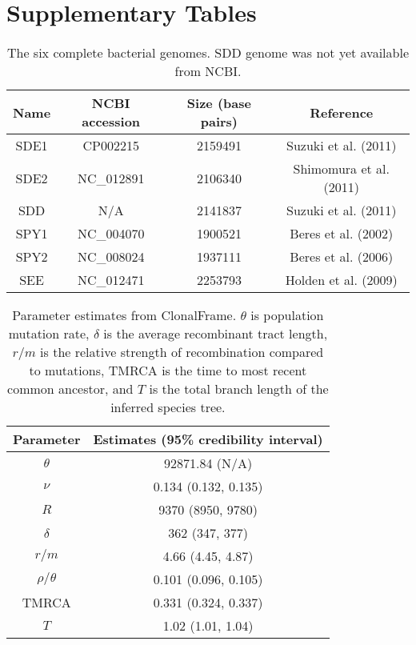 \documentclass[english]{article}
\providecommand{\tabularnewline}{\\}
\begin{document}
\clearpage{}\setcounter{figure}{0}
\setcounter{table}{0}
\renewcommand{\figurename}{Supplementary Figure}
\renewcommand{\tablename}{Supplementary Table}

\section*{Supplementary Tables}
\clearpage{}

\begin{table}
\caption{\label{tab:genome}The six complete bacterial genomes. SDD genome was
not yet available from NCBI.}
\noindent \begin{centering}
\begin{tabular}{cccc}
\hline 
Name & NCBI accession & Size (base pairs) & Reference\tabularnewline
\hline
SDE1 & CP002215 & 2159491 & Suzuki et al. (2011)\tabularnewline
SDE2 & NC\_012891 & 2106340 & Shimomura et al. (2011)\tabularnewline
SDD & N/A & 2141837 & Suzuki et al. (2011)\tabularnewline
SPY1 & NC\_004070 & 1900521 & Beres et al. (2002)\tabularnewline
SPY2 & NC\_008024 & 1937111 & Beres et al. (2006)\tabularnewline
SEE & NC\_012471 & 2253793 & Holden et al. (2009)\tabularnewline
\hline
\end{tabular}
\par\end{centering}
\end{table}
\clearpage{}

\begin{table}
\caption{\label{tab:clonalframe}Parameter estimates from ClonalFrame. 
$\theta$ is population mutation rate,
$\delta$ is the average recombinant tract length,
$r/m$ is the relative strength of recombination compared to mutations,
TMRCA is the time to most recent common ancestor, and
$T$ is the total branch length of the inferred species tree.}
\noindent \centering{}\begin{tabular}{cc}
\hline
Parameter & Estimates (95\% credibility interval) \tabularnewline
\hline
$\theta$ & 92871.84 (N/A)\tabularnewline
$\nu$ & 0.134 (0.132, 0.135)\tabularnewline
$R$ & 9370 (8950, 9780)\tabularnewline
$\delta$ & 362 (347, 377)\tabularnewline
$r/m$ & 4.66 (4.45, 4.87)\tabularnewline
$\rho/\theta$ & 0.101 (0.096, 0.105)\tabularnewline
TMRCA & 0.331 (0.324, 0.337)\tabularnewline
$T$ & 1.02 (1.01, 1.04)\tabularnewline
\hline
\end{tabular}
\end{table}
\clearpage{}
\end{document}
